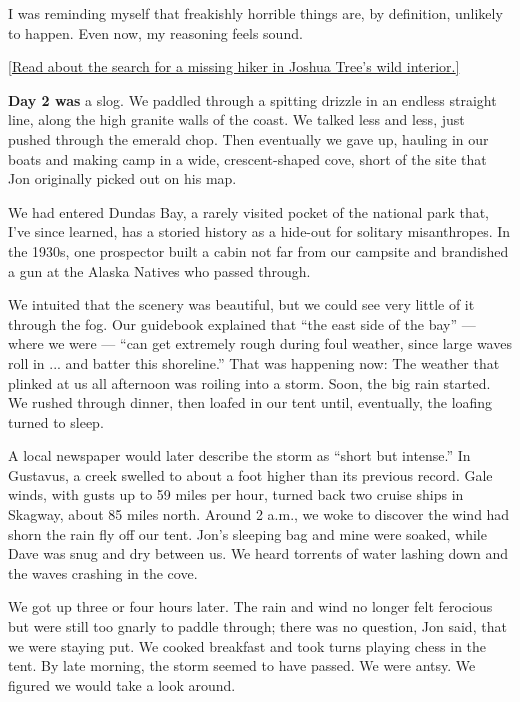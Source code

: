I was reminding myself that freakishly horrible things are, by
definition, unlikely to happen. Even now, my reasoning feels sound.

\href{https://www.nytimes3xbfgragh.onion/interactive/2018/03/22/magazine/voyages-joshua-tree-lost-hiker.html}{{[}Read
about the search for a missing hiker in Joshua Tree's wild interior.{]}}

\textbf{Day 2 was} a slog. We paddled through a spitting drizzle in an
endless straight line, along the high granite walls of the coast. We
talked less and less, just pushed through the emerald chop. Then
eventually we gave up, hauling in our boats and making camp in a wide,
crescent-shaped cove, short of the site that Jon originally picked out
on his map.

We had entered Dundas Bay, a rarely visited pocket of the national park
that, I've since learned, has a storied history as a hide-out for
solitary misanthropes. In the 1930s, one prospector built a cabin not
far from our campsite and brandished a gun at the Alaska Natives who
passed through.

We intuited that the scenery was beautiful, but we could see very little
of it through the fog. Our guidebook explained that ``the east side of
the bay'' --- where we were --- ``can get extremely rough during foul
weather, since large waves roll in ... and batter this shoreline.'' That
was happening now: The weather that plinked at us all afternoon was
roiling into a storm. Soon, the big rain started. We rushed through
dinner, then loafed in our tent until, eventually, the loafing turned to
sleep.

A local newspaper would later describe the storm as ``short but
intense.'' In Gustavus, a creek swelled to about a foot higher than its
previous record. Gale winds, with gusts up to 59 miles per hour, turned
back two cruise ships in Skagway, about 85 miles north. Around 2 a.m.,
we woke to discover the wind had shorn the rain fly off our tent. Jon's
sleeping bag and mine were soaked, while Dave was snug and dry between
us. We heard torrents of water lashing down and the waves crashing in
the cove.

We got up three or four hours later. The rain and wind no longer felt
ferocious but were still too gnarly to paddle through; there was no
question, Jon said, that we were staying put. We cooked breakfast and
took turns playing chess in the tent. By late morning, the storm seemed
to have passed. We were antsy. We figured we would take a look around.

